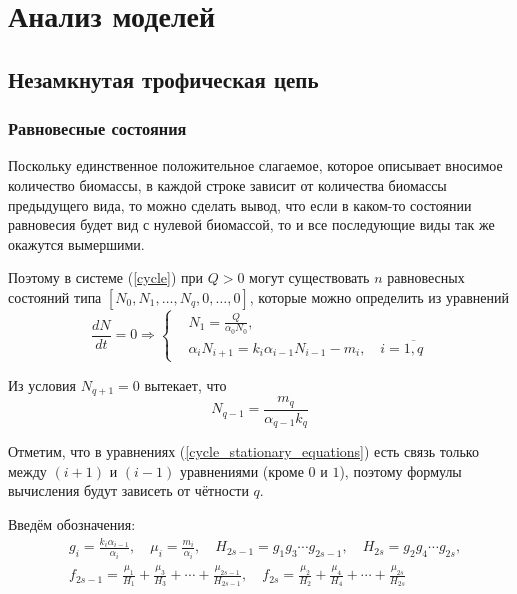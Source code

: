 \section{Анализ моделей}
    \subsection{Незамкнутая трофическая цепь}
    \subsubsection{Равновесные состояния}
        Поскольку единственное положительное слагаемое, которое описывает вносимое количество биомассы, в каждой строке зависит от количества биомассы предыдущего вида, то можно сделать вывод, что если в каком-то состоянии равновесия будет вид с нулевой биомассой, то и все последующие виды так же окажутся вымершими.

        Поэтому в системе (\ref{cycle}) при \(Q > 0\) могут существовать \( n \) равновесных состояний типа \(\left[ N_0, N_1, \ldots, N_q, 0, \ldots, 0 \right]\), которые можно определить из уравнений
        \begin{equation} \label{cycle_stationary_equations}
            \frac{dN}{dt} = 0 \Rightarrow
            \left\lbrace\begin{split}
                & N_1 = \frac{Q}{\alpha_0 N_0}, \\
                & \alpha_i N_{i+1} = k_i \alpha_{i-1} N_{i-1} - m_i, \quad i=\overline{1,q}                
            \end{split}\right.
        \end{equation}

        Из условия \( N_{q+1} = 0 \) вытекает, что 
        \begin{equation}
            N_{q-1} = \frac{m_q}{\alpha_{q-1} k_q}
        \end{equation}

        Отметим, что в уравнениях (\ref{cycle_stationary_equations}) есть связь только между \((i+1)\) и \((i-1)\) уравнениями (кроме \(0\) и \(1\)), поэтому формулы вычисления будут зависеть от чётности \(q\).

        Введём обозначения:
        \begin{equation}
            \begin{split}
            & g_i = \frac{k_i \alpha_{i-1}}{\alpha_i}, \quad \mu_i = \frac{m_i}{\alpha_i}, \quad
            H_{2s-1} = g_1 g_3 \cdots g_{2s-1}, \quad H_{2s} = g_2 g_4 \cdots g_{2s}, \\
            & f_{2s-1} = \frac{\mu_1}{H_1} + \frac{\mu_3}{H_3} + \cdots + \frac{\mu_{2s-1}}{H_{2s-1}}, \quad
            f_{2s} = \frac{\mu_2}{H_2} + \frac{\mu_4}{H_4} + \cdots + \frac{\mu_{2s}}{H_{2s}}
            \end{split}
        \end{equation}

